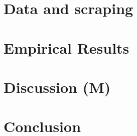 \section{Data and scraping}


\section{Empirical Results}


\section{Discussion (M)}


\section{Conclusion}


\clearpage
\printbibliography
\clearpage

\appendix
\renewcommand\thefigure{\thesection.\arabic{figure}}
\setcounter{figure}{0}
\setcounter{page}{1}



\clearpage


